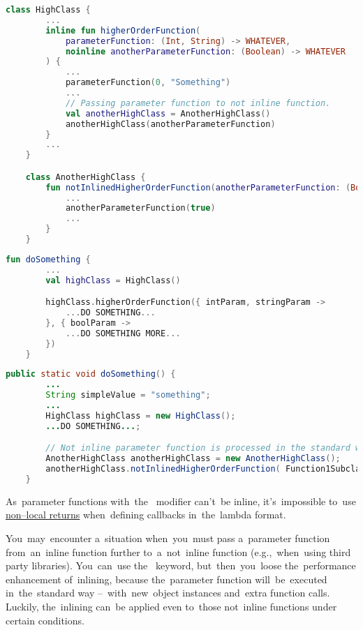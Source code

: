 \example
\begin{lstlisting}[language=Kotlin, title={Classes with functions of higher order}]
    class HighClass {
        ...
        inline fun higherOrderFunction(
            parameterFunction: (Int, String) -> WHATEVER,
            noinline anotherParameterFunction: (Boolean) -> WHATEVER
        ) {
            ...
            parameterFunction(0, "Something")
            ...
            // Passing parameter function to not inline function.
            val anotherHighClass = AnotherHighClass()
            anotherHighClass(anotherParameterFunction)
        }
        ...
    }

    class AnotherHighClass {
        fun notInlinedHigherOrderFunction(anotherParameterFunction: (Boolean) -> WHATEVER) {
            ...
            anotherParameterFunction(true)
            ...
        }
    }
\end{lstlisting}
\begin{lstlisting}[language=Kotlin, title={Calling the~inline function}]
    fun doSomething {
        ...
        val highClass = HighClass()

        highClass.higherOrderFunction({ intParam, stringParam ->
            ...DO SOMETHING...
        }, { boolParam ->
            ...DO SOMETHING MORE...
        })
    }
\end{lstlisting}
\begin{lstlisting}[language=Java, title={Rough Java equivalent of the generated bytecode}]
    public static void doSomething() {
        ...
        String simpleValue = "something";
        ...
        HighClass highClass = new HighClass();
        ...DO SOMETHING...;

        // Not inline parameter function is processed in the standard way.
        AnotherHighClass anotherHighClass = new AnotherHighClass();
        anotherHighClass.notInlinedHigherOrderFunction( Function1Subclass0.INSTANCE);
    }
\end{lstlisting}

\note As~parameter functions with~the~ modifier can't~be inline, it's~impossible to~use \hyperref[kotlinnonlocalreturn]{\mbox{non--local} returns} when~defining callbacks in~the~lambda format.

\label{kotlincrossinline}
You~may~encounter a~situation when~you~must pass a~parameter function from~an~inline function further to~a~not~inline function (e.g.,~when~using third party libraries).
You~can~use the~ keyword, but~then~you~loose the~performance enhancement of~inlining, because the~parameter function will~be~executed in~the~standard way --~with~new~object instances and~extra function calls.
Luckily, the~inlining can~be applied even to~those not~inline functions under certain conditions.


